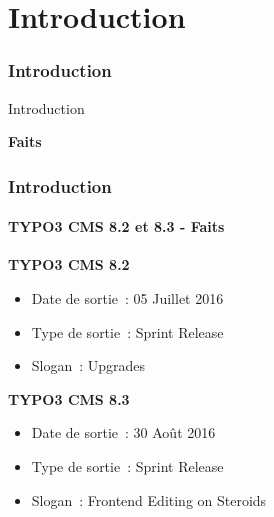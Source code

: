 %

\section{Introduction}
\begin{frame}[fragile]
	\frametitle{Introduction}

	\begin{center}\huge{Introduction}\end{center}
	\begin{center}\huge{\color{typo3darkgrey}\textbf{Faits}}\end{center}

\end{frame}

\begin{frame}[fragile]
	\frametitle{Introduction}
	\framesubtitle{TYPO3 CMS 8.2 et 8.3 - Faits}

	\textbf{TYPO3 CMS 8.2}
	\begin{itemize}
		\item Date de sortie~: 05 Juillet 2016
		\item Type de sortie~: Sprint Release
		\item Slogan~: Upgrades
	\end{itemize}

	\vspace{0.6cm}

	\textbf{TYPO3 CMS 8.3}
	\begin{itemize}
		\item Date de sortie~: 30 Août 2016
		\item Type de sortie~: Sprint Release
		\item Slogan~: Frontend Editing on Steroids
	\end{itemize}


\end{frame}

